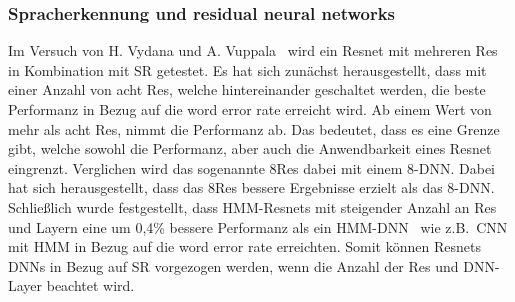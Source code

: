 \subsubsection{Spracherkennung und residual neural networks}
Im Versuch von H. Vydana und A. Vuppala~\cite{residualnn} wird ein Resnet mit mehreren Res in Kombination mit SR getestet. Es hat sich zunächst herausgestellt, dass mit einer Anzahl von acht Res, welche hintereinander geschaltet werden, die beste Performanz in Bezug auf die word error rate erreicht wird. Ab einem Wert von mehr als acht Res, nimmt die Performanz ab. Das bedeutet, dass es eine Grenze gibt, welche sowohl die Performanz, aber auch die Anwendbarkeit eines Resnet eingrenzt. Verglichen wird das sogenannte 8Res dabei mit einem 8-DNN. Dabei hat sich herausgestellt, dass das 8Res bessere Ergebnisse erzielt als das 8-DNN. Schließlich wurde festgestellt, dass HMM-Resnets mit steigender Anzahl an Res und Layern eine um 0,4\% bessere Performanz als ein HMM-DNN~\cite{residualnn} wie z.B.~CNN mit HMM in Bezug auf die word error rate erreichten. Somit können Resnets DNNs in Bezug auf SR vorgezogen werden, wenn die Anzahl der Res und DNN-Layer beachtet wird.


